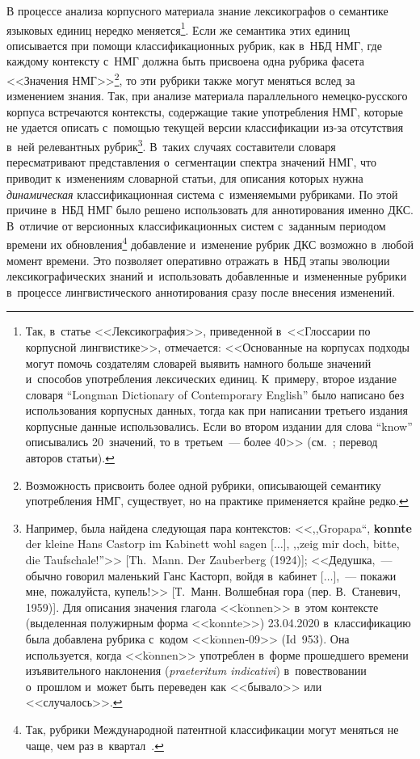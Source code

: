\begin{multicols}{2}
В процессе анализа корпусного материала знание лексикографов о 
семантике языковых единиц нередко меняется\footnote[1]{Так, в~статье 
<<Лексикография>>, приведенной в~<<Глоссарии по корпусной лингвистике>>, отмечается: <<Основанные 
на корпусах подходы могут помочь создателям словарей выявить намного больше значений и~способов 
употребления лексических единиц. К~примеру, второе издание словаря ``Longman Dictionary of Contemporary 
English'' было написано без использования корпусных данных, тогда как при написании третьего издания 
корпусные данные использовались. Если во втором издании для слова ``know'' описывались 20~значений, то 
в~третьем~--- более 40>> (см.~\cite[с.~107--108]{18-go}; перевод авторов статьи).}. Если же семантика 
этих единиц описывается при помощи классификационных рубрик, как 
в~НБД НМГ, где каждому контексту с~НМГ должна быть присвоена одна 
рубрика фасета <<Значения НМГ>>\footnote{Возможность присвоить более одной 
рубрики, описывающей семантику употребления НМГ, существует, но на практике применяется крайне 
редко.}, то эти рубрики также могут меняться вслед за изменением знания. 
Так, при анализе материала параллельного немецко-русского корпуса 
встречаются контексты, содержащие такие употребления НМГ, которые не 
удается описать с~помощью текущей версии классификации из-за 
отсутствия в~ней релевантных рубрик\footnote{Например, была найдена следующая пара 
контекстов: <<,,\mbox{Gro{\hspace*{-1pt}\!\ptb{\ss}}\hspace*{1pt}papa}``, \textbf{konnte} 
der kleine Hans Castorp im Kabinett wohl sagen [$\ldots$], 
,,zeig mir doch, bitte, die Taufschale!''>> [Th.~Mann. Der Zauberberg (1924)]; <<Дедушка,~--- обычно говорил 
маленький Ганс Касторп, войдя в~кабинет [$\ldots$],~--- покажи мне, пожалуйста, купель!>> [Т.~Манн. Волшебная гора (пер. 
В.~Станевич, 1959)]. Для описания значения глагола <<k$\ddot{\mbox{o}}$nnen>> в~этом контексте 
(выделенная полужирным форма <<konnte>>) 23.04.2020 в~классификацию была до\-бав\-ле\-на руб\-ри\-ка с~кодом 
<<k$\ddot{\mbox{o}}$nnen-09>> (Id~953). Она используется, когда <<k$\ddot{\mbox{o}}$nnen>> употреблен 
в~форме прошедшего времени изъявительного наклонения (\textit{praeteritum indicativi}) в~повествовании 
о~прошлом и~может быть переведен как <<бывало>> или <<случалось>>.}. В~таких случаях 
составители словаря пересматривают пред\-став\-ле\-ния о~сегментации спектра 
значений НМГ, что приводит к~изменениям словарной статьи, для 
описания которых нужна \textit{динамическая} классификационная система 
с~изменяемыми рубриками. По этой причине в~НБД НМГ было 
решено использовать для аннотирования именно ДКС. В~отличие от 
версионных классификационных систем с~заданным периодом времени их 
обновления\footnote{Так, рубрики Международной патентной классификации могут меняться не 
чаще, чем раз в~квартал~\cite{19-go}.} до\-бав\-ле\-ние и~изменение рубрик ДКС возможно в~любой 
момент времени. Это позволяет оперативно отражать в~НБД этапы 
эволюции лексикографических знаний и~использовать до\-бав\-лен\-ные 
и~измененные рубрики в~процессе лингвистического аннотирования сразу 
после внесения изменений.


\end{multicols}
